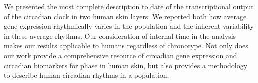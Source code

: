 \normalsize
We presented the most complete description to date of the transcriptional output of the circadian clock in two human skin layers. We reported both how average gene expression rhythmically varies in the population and the inherent variability in these average rhythms. Our consideration of internal time in the analysis makes our results applicable to humans regardless of chronotype. Not only does our work provide a comprehensive resource of circadian gene expression and circadian biomarkers for phase in human skin, but also provides a methodology to describe human circadian rhythms in a population.

